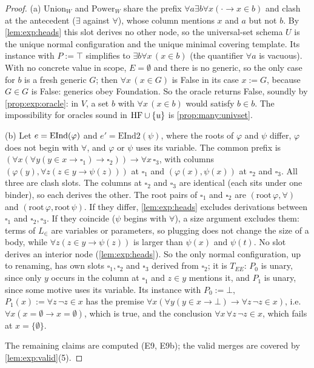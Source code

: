 \begin{proof}
(a) $\mathrm{Union}_W$ and $\mathrm{Power}_W$ share the prefix $\forall a\exists b\forall x(\cdot\to x\in b)$ and clash at the antecedent ($\exists$ against $\forall$), whose column mentions $x$ and $a$ but not $b$. By \cref{lem:exp:heads} this slot derives no other node, so the universal-set schema $U$ is the unique normal configuration and the unique minimal covering template. Its instance with $P:=\top$ simplifies to $\exists b\forall x\,(x\in b)$ (the quantifier $\forall a$ is vacuous). With no concrete value in scope, $E=\emptyset$ and there is no generic, so the only case for $b$ is a fresh generic $G$; then $\forall x\,(x\in G)$ is False in its case $x:=G$, because $G\in G$ is False: generics obey Foundation. So the oracle returns False, soundly by \cref{prop:exp:oracle}: in $V$, a set $b$ with $\forall x\,(x\in b)$ would satisfy $b\in b$. The impossibility for oracles sound in $\mathrm{HF}\cup\{u\}$ is \cref{prop:many:univset}.

(b) Let $e=\mathrm{EInd}(\varphi)$ and $e'=\mathrm{EInd2}(\psi)$, where the roots of $\varphi$ and $\psi$ differ, $\varphi$ does not begin with $\forall$, and $\varphi$ or $\psi$ uses its variable. The common prefix is $(\forall x(\forall y(y\in x\to\square_1)\to\square_2))\to\forall x\,\square_3$, with columns $(\varphi(y),\forall z(z\in y\to\psi(z)))$ at $\square_1$ and $(\varphi(x),\psi(x))$ at $\square_2$ and $\square_3$. All three are clash slots. The columns at $\square_2$ and $\square_3$ are identical (each sits under one binder), so each derives the other. The root pairs of $\square_1$ and $\square_2$ are $(\mathrm{root}\,\varphi,\forall)$ and $(\mathrm{root}\,\varphi,\mathrm{root}\,\psi)$. If they differ, \cref{lem:exp:heads} excludes derivations between $\square_1$ and $\square_2,\square_3$. If they coincide ($\psi$ begins with $\forall$), a size argument excludes them: terms of $L_\in$ are variables or parameters, so plugging does not change the size of a body, while $\forall z(z\in y\to\psi(z))$ is larger than $\psi(x)$ and $\psi(t)$. No slot derives an interior node (\cref{lem:exp:heads}). So the only normal configuration, up to renaming, has own slots $\square_1,\square_2$ and $\square_3$ derived from $\square_2$; it is $T_{EE}$: $P_0$ is unary, since only $y$ occurs in the column at $\square_1$ and $z\in y$ mentions it, and $P_1$ is unary, since some motive uses its variable. Its instance with $P_0:=\bot$, $P_1(x):=\forall z\,\neg z\in x$ has the premise $\forall x(\forall y(y\in x\to\bot)\to\forall z\,\neg z\in x)$, i.e.\ $\forall x(x=\emptyset\to x=\emptyset)$, which is true, and the conclusion $\forall x\,\forall z\,\neg z\in x$, which fails at $x=\{\emptyset\}$.

The remaining claims are computed (E9, E9b); the valid merges are covered by \cref{lem:exp:valid}(5).
\end{proof}

